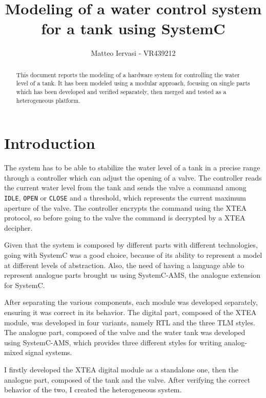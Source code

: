\documentclass[]{IEEEtran}
\title{Modeling of a water control system for a tank using SystemC}
\author{Matteo Iervasi - VR439212}
\begin{document}
\maketitle

\begin{abstract}
This document reports the modeling of a hardware system for controlling the water level of a tank.
It has been modeled using a modular approach, focusing on single parts which has been developed and verified separately,
then merged and tested as a heterogeneous platform.
\end{abstract}


\section{Introduction}
The system has to be able to stabilize the water level of a tank in a precise range through a controller which can adjust
the opening of a valve.
The controller reads the current water level from the tank and sends the valve a command among \texttt{IDLE}, \texttt{OPEN} or \texttt{CLOSE} 
and a threshold, which represents the current maximum aperture of the valve.
The controller encrypts the command using the XTEA protocol, so before going to the valve the command is decrypted by a XTEA decipher.

Given that the system is composed by different parts with different technologies, going with SystemC was a good choice, because of its
ability to represent a model at different levels of abstraction.
Also, the need of having a language able to represent analogue parts brought us using SystemC-AMS, the analogue extension for SystemC.

After separating the various components, each module was developed separately, ensuring it was correct in its behavior.
The digital part, composed of the XTEA module, was developed in four variants, namely RTL and the three TLM styles.
The analogue part, composed of the valve and the water tank was developed using SystemC-AMS, which provides three different
styles for writing analog-mixed signal systems.

I firstly developed the XTEA digital module as a standalone one, then the analogue part, composed of the tank and the valve.
After verifying the correct behavior of the two, I created the heterogeneous system.
\end{document}
